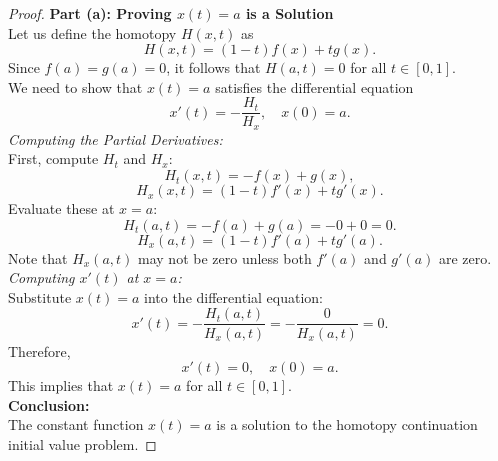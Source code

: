 \documentclass{article}
\begin{document}
\begin{proof}
    \textbf{Part (a): Proving \( x(t) = a \) is a Solution}
    \\
    Let us define the homotopy \( H(x, t) \) as
    \[
        H(x, t) = (1 - t) f(x) + t g(x).
    \]
    Since \( f(a) = g(a) = 0 \), it follows that \( H(a, t) = 0 \) for all \( t \in [0, 1] \).
    \\
    We need to show that \( x(t) = a \) satisfies the differential equation
    \[
        x'(t) = -\frac{H_t}{H_x}, \quad x(0) = a.
    \]
    \textit{Computing the Partial Derivatives:}
    \\
    First, compute \( H_t \) and \( H_x \):
    \[
        H_t(x, t) = -f(x) + g(x),
    \]
    \[
        H_x(x, t) = (1 - t) f'(x) + t g'(x).
    \]
    Evaluate these at \( x = a \):
    \[
        H_t(a, t) = -f(a) + g(a) = -0 + 0 = 0.
    \]
    \[
        H_x(a, t) = (1 - t) f'(a) + t g'(a).
    \]
    Note that \( H_x(a, t) \) may not be zero unless both \( f'(a) \) and \( g'(a) \) are zero.
    \\
    \textit{Computing \( x'(t) \) at \( x = a \):}
    \\
    Substitute \( x(t) = a \) into the differential equation:
    \[
        x'(t) = -\frac{H_t(a, t)}{H_x(a, t)} = -\frac{0}{H_x(a, t)} = 0.
    \]
    Therefore,
    \[
        x'(t) = 0, \quad x(0) = a.
    \]
    This implies that \( x(t) = a \) for all \( t \in [0, 1] \).
    \\
    \textbf{Conclusion:}
    \\
    The constant function \( x(t) = a \) is a solution to the homotopy continuation initial value problem.
\end{proof}
\end{document}
